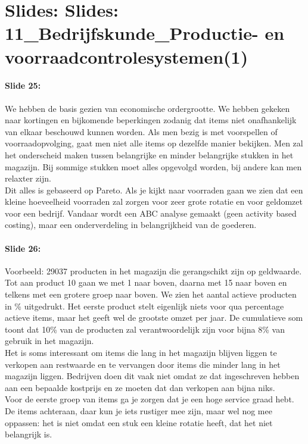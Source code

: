 \documentclass[10pt,a4paper]{report}
\begin{document}
\section{Slides: Slides: 11\_Bedrijfskunde\_Productie- en voorraadcontrolesystemen(1)}

\paragraph{Slide 25:} We hebben de basis gezien van economische ordergrootte. We hebben gekeken naar kortingen en bijkomende beperkingen zodanig dat items niet onafhankelijk van elkaar beschouwd kunnen worden. Als men bezig is met voorspellen of voorraadopvolging, gaat men niet alle items op dezelfde manier bekijken. Men zal het onderscheid maken tussen belangrijke en minder belangrijke stukken in het magazijn. Bij sommige stukken moet alles opgevolgd worden, bij andere kan men relaxter zijn.\\
Dit alles is gebaseerd op Pareto. Als je kijkt naar voorraden gaan we zien dat een kleine hoeveelheid voorraden zal zorgen voor zeer grote rotatie en voor geldomzet voor een bedrijf. Vandaar wordt een ABC analyse gemaakt (geen activity based costing), maar een onderverdeling in belangrijkheid van de goederen.

\paragraph{Slide 26:} Voorbeeld: 29037 producten in het magazijn die gerangschikt zijn op geldwaarde. Tot aan product 10 gaan we met 1 naar boven, daarna met 15 naar boven en telkens met een grotere groep naar boven. We zien het aantal actieve producten in \% uitgedrukt. Het eerste product stelt eigenlijk niets voor qua percentage actieve items, maar het geeft wel de grootste omzet per jaar. De cumulatieve som toont dat 10\% van de producten zal verantwoordelijk zijn voor bijna 8\% van gebruik in het magazijn. \\
Het is soms interessant om items die lang in het magazijn blijven liggen te verkopen aan restwaarde en te vervangen door items die minder lang in het magazijn liggen. Bedrijven doen dit vaak niet omdat ze dat ingeschreven hebben aan een bepaalde kostprijs en ze moeten dat dan verkopen aan bijna niks.\\
Voor de eerste groep van items ga je zorgen dat je een hoge service graad hebt. De items achteraan, daar kun je iets rustiger mee zijn, maar wel nog mee oppassen: het is niet omdat een stuk een kleine rotatie heeft, dat het niet belangrijk is.
\end{document}
